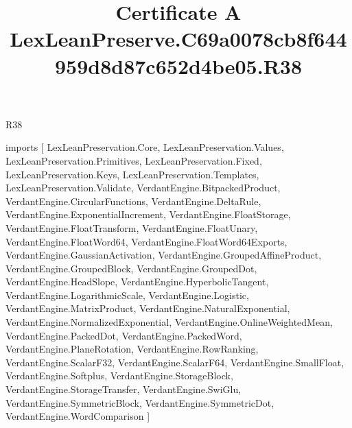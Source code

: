 \begin{lexlean}{R38}
\title{Certificate A LexLeanPreserve.C69a0078cb8f644959d8d87c652d4be05.R38}
\begin{coremodule}
imports [
  LexLeanPreservation.Core,
  LexLeanPreservation.Values,
  LexLeanPreservation.Primitives,
  LexLeanPreservation.Fixed,
  LexLeanPreservation.Keys,
  LexLeanPreservation.Templates,
  LexLeanPreservation.Validate,
  VerdantEngine.BitpackedProduct,
  VerdantEngine.CircularFunctions,
  VerdantEngine.DeltaRule,
  VerdantEngine.ExponentialIncrement,
  VerdantEngine.FloatStorage,
  VerdantEngine.FloatTransform,
  VerdantEngine.FloatUnary,
  VerdantEngine.FloatWord64,
  VerdantEngine.FloatWord64Exports,
  VerdantEngine.GaussianActivation,
  VerdantEngine.GroupedAffineProduct,
  VerdantEngine.GroupedBlock,
  VerdantEngine.GroupedDot,
  VerdantEngine.HeadSlope,
  VerdantEngine.HyperbolicTangent,
  VerdantEngine.LogarithmicScale,
  VerdantEngine.Logistic,
  VerdantEngine.MatrixProduct,
  VerdantEngine.NaturalExponential,
  VerdantEngine.NormalizedExponential,
  VerdantEngine.OnlineWeightedMean,
  VerdantEngine.PackedDot,
  VerdantEngine.PackedWord,
  VerdantEngine.PlaneRotation,
  VerdantEngine.RowRanking,
  VerdantEngine.ScalarF32,
  VerdantEngine.ScalarF64,
  VerdantEngine.SmallFloat,
  VerdantEngine.Softplus,
  VerdantEngine.StorageBlock,
  VerdantEngine.StorageTransfer,
  VerdantEngine.SwiGlu,
  VerdantEngine.SymmetricBlock,
  VerdantEngine.SymmetricDot,
  VerdantEngine.WordComparison
]


\end{coremodule}
\end{lexlean}
